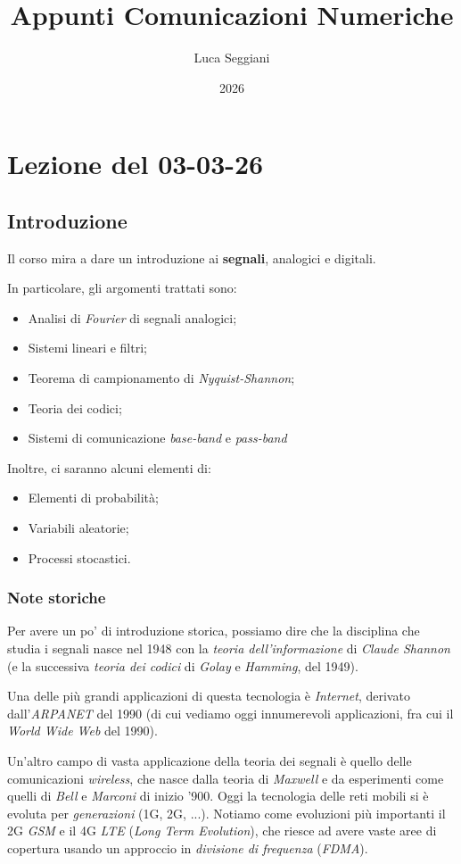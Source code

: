 \documentclass[a4paper,11pt]{article}
\title{Appunti Comunicazioni Numeriche}
\author{Luca Seggiani}
\date{2026}
\begin{document}
\section{Lezione del 03-03-26}

\thispagestyle{empty}
\pagestyle{fancy}

\subsection{Introduzione}
Il corso mira a dare un introduzione ai \textbf{segnali}, analogici e digitali.

In particolare, gli argomenti trattati sono:
\begin{itemize}
	\item Analisi di \textit{Fourier} di segnali analogici;
	\item Sistemi lineari e filtri;
	\item Teorema di campionamento di \textit{Nyquist-Shannon};
	\item Teoria dei codici;
	\item Sistemi di comunicazione \textit{base-band} e \textit{pass-band}
\end{itemize}

Inoltre, ci saranno alcuni elementi di:
\begin{itemize}
	\item Elementi di probabilità;
	\item Variabili aleatorie;
	\item Processi stocastici.
\end{itemize}

\subsubsection{Note storiche}
Per avere un po' di introduzione storica, possiamo dire che la disciplina che studia i segnali nasce nel 1948 con la \textit{teoria dell'informazione} di \textit{Claude Shannon} (e la successiva \textit{teoria dei codici} di \textit{Golay} e \textit{Hamming}, del 1949).

Una delle più grandi applicazioni di questa tecnologia è \textit{Internet}, derivato dall'\textit{ARPANET} del 1990 (di cui vediamo oggi innumerevoli applicazioni, fra cui il \textit{World Wide Web} del 1990).

Un'altro campo di vasta applicazione della teoria dei segnali è quello delle comunicazioni \textit{wireless}, che nasce dalla teoria di \textit{Maxwell} e da esperimenti come quelli di \textit{Bell} e \textit{Marconi} di inizio '900.
Oggi la tecnologia delle reti mobili si è evoluta per \textit{generazioni} (1G, 2G, ...). Notiamo come evoluzioni più importanti il 2G \textit{GSM} e il 4G \textit{LTE} (\textit{Long Term Evolution}), che riesce ad avere vaste aree di copertura usando un approccio in \textit{divisione di frequenza} (\textit{FDMA}).
\end{document}
